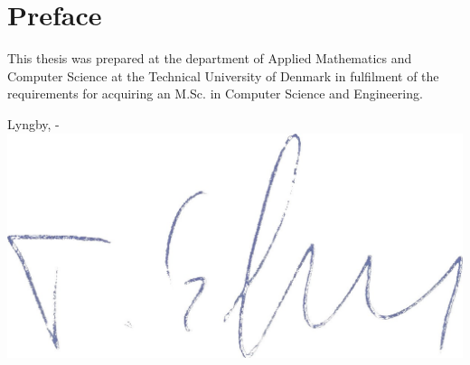 \chapter{Preface}

This thesis was prepared at the department of Applied Mathematics and Computer Science at the Technical University of Denmark in fulfilment of the
requirements for acquiring an M.Sc. in Computer Science and Engineering.

\vspace{20mm}
\begin{center}
    \hspace{20mm} Lyngby, \thesishandin-\thesisyear
    \vspace{5mm}
    \newline
    \includegraphics[scale=0.1]{figures/semn.jpg}
\end{center}
\begin{flushright}
    \thesisauthor
\end{flushright}
